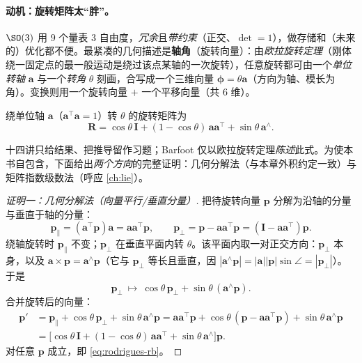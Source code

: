 \paragraph{动机：旋转矩阵太“胖”。}$\SO(3)$ 用 $9$ 个量表 $3$ 自由度，\emph{冗余}且\emph{带约束}（正交、$\det=1$），做存储和（未来的）优化都不便\cite{gaoxiang2019slam14}。最紧凑的几何描述是\textbf{轴角}（旋转向量）：由\emph{欧拉旋转定理}（刚体绕一固定点的最一般运动是绕过该点某轴的一次旋转\cite{barfoot2024state}），任意旋转都可由一个\emph{单位转轴} $\mathbf{a}$ 与一个\emph{转角} $\theta$ 刻画，合写成一个三维向量 $\boldsymbol{\phi}=\theta\mathbf{a}$（方向为轴、模长为角）。变换则用一个旋转向量 $+$ 一个平移向量（共 $6$ 维）。

\begin{theorem}\label{thm:rodrigues-rb}
绕单位轴 $\mathbf{a}$（$\mathbf{a}^\top\mathbf{a}=1$）转 $\theta$ 的旋转矩阵为
\begin{equation}
  \mathbf{R}=\cos\theta\,\mathbf{I}+(1-\cos\theta)\,\mathbf{a}\mathbf{a}^\top+\sin\theta\,\mathbf{a}^\wedge.
  \label{eq:rodrigues-rb}
\end{equation}
\end{theorem}
\noindent 十四讲只给结果、把推导留作习题；Barfoot 仅以欧拉旋转定理\emph{陈述}此式。为使本书自包含，下面给出\emph{两个方向}的完整证明：几何分解法（与本章外积约定一致）与矩阵指数级数法（呼应 \cref{ch:lie}）。

\begin{proof}[证明一：几何分解法（向量平行/垂直分量）]
把待旋转向量 $\mathbf{p}$ 分解为沿轴的分量与垂直于轴的分量：
\[
  \mathbf{p}_\parallel=(\mathbf{a}^\top\mathbf{p})\mathbf{a}=\mathbf{a}\mathbf{a}^\top\mathbf{p},\qquad
  \mathbf{p}_\perp=\mathbf{p}-\mathbf{a}\mathbf{a}^\top\mathbf{p}=(\mathbf{I}-\mathbf{a}\mathbf{a}^\top)\mathbf{p}.
\]
绕轴旋转时 $\mathbf{p}_\parallel$ 不变；$\mathbf{p}_\perp$ 在垂直平面内转 $\theta$。该平面内取一对正交方向：$\mathbf{p}_\perp$ 本身，以及 $\mathbf{a}\times\mathbf{p}=\mathbf{a}^\wedge\mathbf{p}$（它与 $\mathbf{p}_\perp$ 等长且垂直，因 $|\mathbf{a}^\wedge\mathbf{p}|=|\mathbf{a}||\mathbf{p}|\sin\angle=|\mathbf{p}_\perp|$）。于是
\[
  \mathbf{p}_\perp\ \longmapsto\ \cos\theta\,\mathbf{p}_\perp+\sin\theta\,(\mathbf{a}^\wedge\mathbf{p}).
\]
合并旋转后的向量：
\begin{align*}
  \mathbf{p}'&=\mathbf{p}_\parallel+\cos\theta\,\mathbf{p}_\perp+\sin\theta\,\mathbf{a}^\wedge\mathbf{p}
   =\mathbf{a}\mathbf{a}^\top\mathbf{p}+\cos\theta\,(\mathbf{p}-\mathbf{a}\mathbf{a}^\top\mathbf{p})+\sin\theta\,\mathbf{a}^\wedge\mathbf{p}\\
  &=\big[\cos\theta\,\mathbf{I}+(1-\cos\theta)\,\mathbf{a}\mathbf{a}^\top+\sin\theta\,\mathbf{a}^\wedge\big]\mathbf{p}.
\end{align*}
对任意 $\mathbf{p}$ 成立，即 \cref{eq:rodrigues-rb}。
\end{proof}

